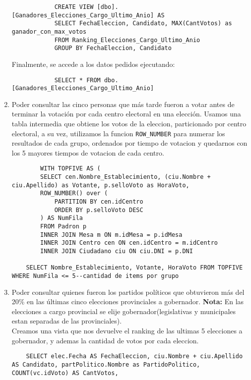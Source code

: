 \begin{enumerate}
		\begin{lstlisting}
			CREATE VIEW [dbo].[Ganadores_Elecciones_Cargo_Ultimo_Anio] AS
			SELECT FechaEleccion, Candidato, MAX(CantVotos) as ganador_con_max_votos
			FROM Ranking_Elecciones_Cargo_Ultimo_Anio
			GROUP BY FechaEleccion, Candidato
		\end{lstlisting}

		Finalmente, se accede a los datos pedidos ejecutando:
		\begin{lstlisting}
			SELECT * FROM dbo.[Ganadores_Elecciones_Cargo_Ultimo_Anio]
		\end{lstlisting}

	\item Poder consultar las cinco personas que más tarde fueron a votar antes de terminar
	la votación por cada centro electoral en una elección.
	Usamos una tabla intermedia que obtiene los votos de la eleccion, particionado por centro electoral, a su vez, utilizamos la funcion \texttt{ROW\_NUMBER} para numerar los resultados de cada grupo, ordenados por tiempo de votacion y quedarnos con los 5 mayores tiempos de votacion de cada centro.
	\begin{lstlisting}
		WITH TOPFIVE AS (
	    SELECT cen.Nombre_Establecimiento, (ciu.Nombre + ciu.Apellido) as Votante, p.selloVoto as HoraVoto,
	    ROW_NUMBER() over (
	        PARTITION BY cen.idCentro
	        ORDER BY p.selloVoto DESC
	    ) AS NumFila
	    FROM Padron p
	    INNER JOIN Mesa m ON m.idMesa = p.idMesa
	    INNER JOIN Centro cen ON cen.idCentro = m.idCentro
	    INNER JOIN Ciudadano ciu ON ciu.DNI = p.DNI
	    
	SELECT Nombre_Establecimiento, Votante, HoraVoto FROM TOPFIVE WHERE NumFila <= 5--cantidad de items por grupo
	\end{lstlisting}

	\item Poder consultar quienes fueron los partidos políticos que obtuvieron más del 20\%
	en las últimas cinco elecciones provinciales a gobernador.
	\textbf{Nota:} En las elecciones a cargo provincial se elije gobernador(legislativas y municipales estan separadas de las provinciales).\\

Creamos una vista que nos devuelve el ranking de las ultimas 5 elecciones a gobernador, y ademas la cantidad de votos por cada eleccion.

\begin{lstlisting}
	SELECT elec.Fecha AS FechaEleccion, ciu.Nombre + ciu.Apellido AS Candidato, partPolitico.Nombre as PartidoPolitico, 
COUNT(vc.idVoto) AS CantVotos,  


\end{lstlisting}
\end{enumerate}
